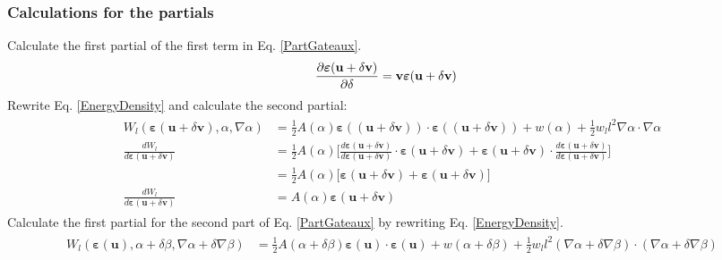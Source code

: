\documentclass[12pt,3p]{article}
\numberwithin{equation}{section}
\begin{document}
\subsubsection{Calculations for the partials} 
Calculate the first partial of the first term in Eq. \ref{PartGateaux}. 
\begin{align*}
\begin{split}
\pdv{\boldsymbol{\varepsilon} (\mathbf{u} + \delta \mathbf{v})}{\delta} &= \mathbf{v} \boldsymbol{\varepsilon} (\mathbf{u} + \delta \mathbf{v})
\end{split}
\end{align*}
Rewrite Eq. \ref{EnergyDensity} and calculate the second partial: 
\begin{align*}
\begin{split}
W_l (\boldsymbol{\varepsilon} (\mathbf{u} + \delta \mathbf{v}), \alpha, \nabla \alpha) &= \frac{1}{2} A (\alpha) \boldsymbol{\varepsilon} ((\mathbf{u} + \delta \mathbf{v})) \cdot \boldsymbol{\varepsilon} ((\mathbf{u} + \delta \mathbf{v})) + w (\alpha) + \frac{1}{2} w_l l^2 \nabla \alpha \cdot \nabla \alpha	\\
\frac{d W_l}{d \boldsymbol{\varepsilon} (\mathbf{u} + \delta \mathbf{v})} &= \frac{1}{2} A(\alpha) \bigg[ \frac{d \boldsymbol{\varepsilon} (\mathbf{u} + \delta \mathbf{v})}{d \boldsymbol{\varepsilon} (\mathbf{u} + \delta \mathbf{v})} \cdot \boldsymbol{\varepsilon} (\mathbf{u} + \delta \mathbf{v}) + \boldsymbol{\varepsilon} (\mathbf{u} + \delta \mathbf{v}) \cdot \frac{d \boldsymbol{\varepsilon} (\mathbf{u} + \delta \mathbf{v})}{d \boldsymbol{\varepsilon} (\mathbf{u} + \delta \mathbf{v})} \bigg] \\
        &= \frac{1}{2} A(\alpha) \big[ \boldsymbol{\varepsilon} (\mathbf{u} + \delta \mathbf{v}) + \boldsymbol{\varepsilon} (\mathbf{u} + \delta \mathbf{v}) \big] \\
\frac{d W_l}{d \boldsymbol{\varepsilon} (\mathbf{u} + \delta \mathbf{v})} &= A(\alpha) \boldsymbol{\varepsilon} (\mathbf{u} + \delta \mathbf{v})
\end{split}
\end{align*}
Calculate the first partial for the second part of  Eq. \ref{PartGateaux} by rewriting Eq. \ref{EnergyDensity}. 
\begin{align*}
\begin{split}
W_l (\boldsymbol{\varepsilon} (\mathbf{u}), \alpha + \delta \beta , \nabla \alpha + \delta \nabla \beta) &= \frac{1}{2} A (\alpha + \delta \beta) \boldsymbol{\varepsilon} (\mathbf{u}) \cdot \boldsymbol{\varepsilon} (\mathbf{u}) + w (\alpha + \delta \beta) + \frac{1}{2} w_l l^2 ( \nabla \alpha + \delta \nabla \beta) \cdot (\nabla \alpha + \delta \nabla \beta) \\
\end{split}
\end{align*}
\end{document}
